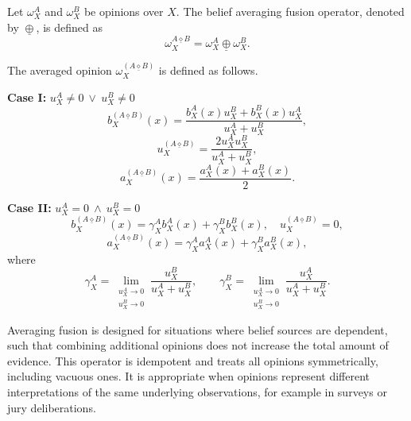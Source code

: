 \begin{definition}
\label{def:averaging_fuse}
Let $\omega_X^A$ and $\omega_X^B$ be opinions over $X$.
The belief averaging fusion operator, denoted by $\underline{\oplus} $, is defined as
\[
\omega_X^{A\underline{\diamond} B} = \omega_X^A \underline{\oplus} \omega_X^B .
\]

The averaged opinion $\omega_X^{(A\underline{\diamond} B)}$ is defined as follows.

\textbf{Case I:} $u_X^A \neq 0 \ \vee\ u_X^B \neq 0$
\[
b_X^{(A\underline{\diamond} B)}(x)=
\frac{b_X^A(x)u_X^B+b_X^B(x)u_X^A}{u_X^A+u_X^B},
\]
\[
u_X^{(A\underline{\diamond} B)}=
\frac{2u_X^A u_X^B}{u_X^A+u_X^B},
\]
\[
a_X^{(A\underline{\diamond} B)}(x)=\frac{a_X^A(x)+a_X^B(x)}{2}.
\]

\textbf{Case II:} $u_X^A=0 \ \wedge\ u_X^B=0$
\[
b_X^{(A\underline{\diamond} B)}(x)=\gamma_X^A b_X^A(x)+\gamma_X^B b_X^B(x),
\quad
u_X^{(A\underline{\diamond} B)}=0,
\]
\[
a_X^{(A\underline{\diamond} B)}(x)=\gamma_X^A a_X^A(x)+\gamma_X^B a_X^B(x),
\]
where
\[
\gamma_X^A=\lim_{\substack{u_X^A\to0\\u_X^B\to0}}\frac{u_X^B}{u_X^A+u_X^B},
\qquad
\gamma_X^B=\lim_{\substack{u_X^A\to0\\u_X^B\to0}}\frac{u_X^A}{u_X^A+u_X^B}.
\]

\end{definition}

Averaging fusion is designed for situations where belief sources are dependent, such that combining additional opinions does not increase the total amount of evidence. This operator is idempotent and treats all opinions symmetrically, including vacuous ones. It is appropriate when opinions represent different interpretations of the same underlying observations, for example in surveys or jury deliberations.

